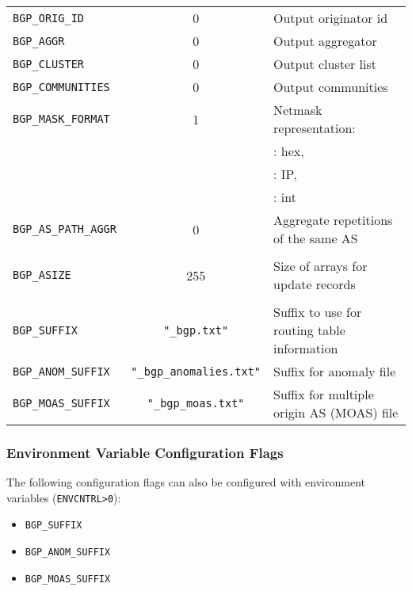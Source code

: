 \documentclass[documentation]{subfiles}
\begin{document}
\begin{longtable}{>{\tt}lcl}
    BGP\_ORIG\_ID        & 0   & Output originator id\\
    BGP\_AGGR            & 0   & Output aggregator\\
    BGP\_CLUSTER         & 0   & Output cluster list\\
    BGP\_COMMUNITIES     & 0   & Output communities\\
    BGP\_MASK\_FORMAT    & 1   & Netmask representation:\\
                         &     & \qquad 0: hex,\\
                         &     & \qquad 1: IP,\\
                         &     & \qquad 2: int\\
    BGP\_AS\_PATH\_AGGR  & 0   & Aggregate repetitions of the same AS\\
    \\
    BGP\_ASIZE           & 255 & Size of arrays for update records\\
    \\
    BGP\_SUFFIX          & {\tt\small "\_bgp.txt"}
                               & Suffix to use for routing table information\\
    BGP\_ANOM\_SUFFIX    & {\tt\small "\_bgp\_anomalies.txt"}
                               & Suffix for anomaly file\\
    BGP\_MOAS\_SUFFIX    & {\tt\small "\_bgp\_moas.txt"}
                               & Suffix for multiple origin AS (MOAS) file\\
    \bottomrule
\end{longtable}

\subsubsection{Environment Variable Configuration Flags}
The following configuration flags can also be configured with environment variables ({\tt ENVCNTRL>0}):
\begin{itemize}
    \item {\tt BGP\_SUFFIX}
    \item {\tt BGP\_ANOM\_SUFFIX}
    \item {\tt BGP\_MOAS\_SUFFIX}
\end{itemize}
\end{document}
